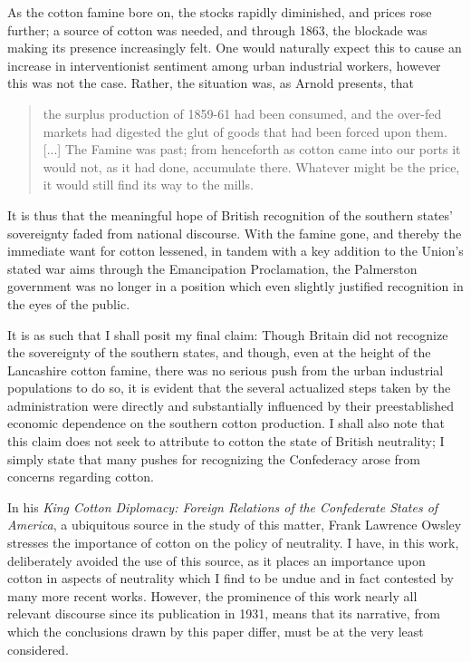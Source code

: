 As the cotton famine bore on, the stocks rapidly diminished, and prices rose further; a source of cotton was needed, and through 1863, the blockade was making its presence increasingly felt. One would naturally expect this to cause  an increase in interventionist sentiment among urban industrial workers, however this was not the case\autocite{steeleOntologicalSecurity2005}. Rather, the situation was, as Arnold presents, that
\begin{quote}
  the surplus production of 1859-61 had been consumed, and the over-fed markets had digested the glut of goods that had been forced upon them. [...]
  The Famine was past; from henceforth as cotton came into our ports it would not, as it had done, accumulate there. Whatever might be the
  price, it would still find its way to the mills. \Autocite[331]{arnoldHistoryCotton1864}
\end{quote}
It is thus that the meaningful hope of British recognition of the southern states' sovereignty faded from national discourse. With the famine gone, and thereby the immediate want for cotton lessened, in tandem with a key addition to the Union's stated war aims through the Emancipation Proclamation, the Palmerston government was no longer in a position which even slightly justified recognition in the eyes of the public\Autocites{ewanEmancipationProclamation2005}{steeleOntologicalSecurity2005}.

It is as such that I shall posit my final claim: Though Britain did not recognize the sovereignty of the southern states, and though,
even at the height of the Lancashire cotton famine, there was no serious push from the urban industrial populations to do so, it is evident that the several actualized
steps taken by the administration were directly and substantially influenced by their preestablished economic dependence on the southern cotton production. I shall
also note that this claim does not seek to attribute to cotton the state of British neutrality; I simply state that many pushes for
recognizing the Confederacy arose from concerns regarding cotton.

\hfill

In his \textit{King Cotton Diplomacy: Foreign Relations of the Confederate States of America}, a ubiquitous source in the study of this matter,
Frank Lawrence Owsley stresses the importance of cotton on the policy of neutrality. I have, in this work,
deliberately avoided the use of this source, as it places an importance upon cotton in aspects of neutrality which I find to be undue and in fact contested by
many more recent works. However, the prominence of this work nearly all relevant discourse since its publication in 1931, means that
its narrative, from which the conclusions drawn by this paper differ, must be at the very least considered.

